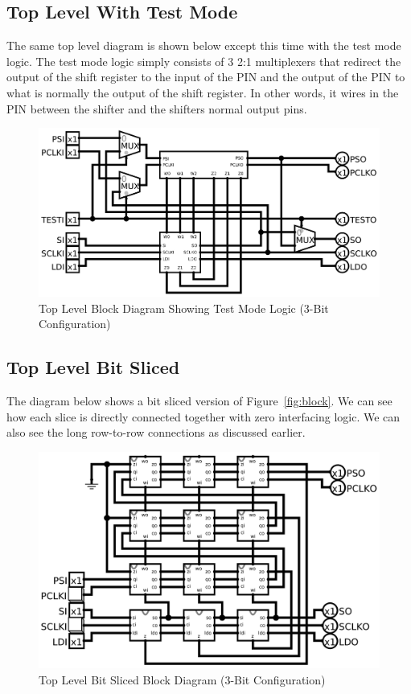\documentclass{article}
\begin{document}
    \subsection{Top Level With Test Mode }
    The same top level diagram is shown below except this time with the test
    mode logic. The test mode logic simply consists of 3 2:1 multiplexers that
    redirect the output of the shift register to the input of the PIN and the
    output of the PIN to what is normally the output of the shift register. In
    other words, it wires in the PIN between the shifter and the shifters
    normal output pins.
    \begin{figure}[H]
        \centering
        \includegraphics[width=0.9\linewidth]{../../logisim/test_mode.png}
        \caption{Top Level Block Diagram Showing Test Mode Logic (3-Bit Configuration)}
    \end{figure}

    \subsection{Top Level Bit Sliced}
    The diagram below shows a bit sliced version of Figure~\ref{fig:block}. We
    can see how each slice is directly connected together with zero interfacing
    logic.  We can also see the long row-to-row connections as discussed
    earlier.
    \vspace{2\baselineskip}
    \begin{figure}[H]
        \centering
        \includegraphics[width=\linewidth]{../../logisim/top_internal.png}
        \caption{Top Level Bit Sliced Block Diagram (3-Bit Configuration)}
    \end{figure}
\end{document}
